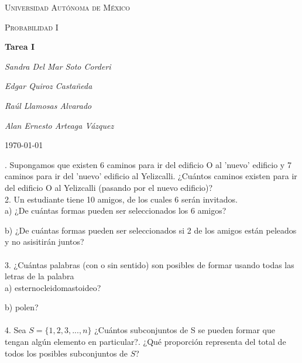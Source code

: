 \documentclass[12pt,a4paper]{report}
\begin{document}
\begin{titlepage}
	\centering
	{\scshape\LARGE Universidad Autónoma de México \par}
	\vspace{1cm}
	{\scshape\Large Probabilidad I\par}
	\vspace{1.5cm}
	{\huge\bfseries Tarea I\par}
	\vspace{.5cm}
	{\Large\itshape Sandra Del Mar Soto Corderi \par}
	\vspace{.5cm}
	{\Large\itshape Edgar Quiroz Castañeda \par}
    \vspace{.5cm}
	{\Large\itshape Raúl Llamosas Alvarado \par}
	 \vspace{.5cm}
	{\Large\itshape Alan Ernesto Arteaga Vázquez \par}
	\vfill
	
	\vfill

	{\large \today\par}
\end{titlepage}

. Supongamos que existen 6 caminos para ir del edificio O al ’nuevo’
       edificio y 7 caminos para ir del ’nuevo’ edificio al Yelizcalli.
       ¿Cuántos caminos existen para ir del edificio O al Yelizcalli
       (pasando por el nuevo edificio)?\\


    2. Un estudiante tiene 10 amigos, de los cuales 6 serán invitados.\\

        a) ¿De cuántas formas pueden ser seleccionados los 6 amigos?

        b) ¿De cuántas formas pueden ser seleccionados si 2 de los amigos están
            peleados y no asisitirán juntos?\\\\

    3. ¿Cuántas palabras (con o sin sentido) son posibles de formar usando todas
       las letras de la palabra\\

       a) esternocleidomastoideo?

       b) polen?\\\\


    4. Sea $S = \{1, 2, 3, ... , n\}$ ¿Cuántos subconjuntos de S se pueden
       formar que tengan algún elemento en particular?. ¿Qué proporción
       representa del total de todos los posibles subconjuntos de $S$?\\\\
\end{document}
